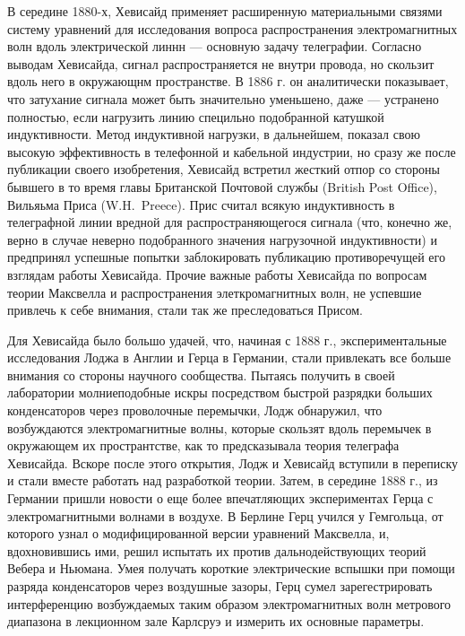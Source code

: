 \documentclass[12pt, oneside, a4paper]{article}
\begin{document}
В середине 1880-х, Хевисайд применяет расширенную материальными связями систему уравнений для исследования вопроса распространения электромагнитных волн вдоль электрической линнн --- основную задачу телеграфии. Согласно выводам Хевисайда, сигнал распространяется не внутри провода, но скользит вдоль него в окружающнм пространстве. В 1886 г. он аналитически показывает, что затухание сигнала может быть значительно уменьшено, даже --- устранено полностью, если нагрузить линию специльно подобранной катушкой индуктивности. Метод индуктивной нагрузки, в дальнейшем, показал свою высокую эффективность в телефонной и кабельной индустрии, но сразу же после публикации своего изобретения, Хевисайд встретил жесткий отпор со стороны бывшего в то время главы Британской Почтовой службы (British Post Office), Вильяьма Приса (W.H.~Preece). Прис считал всякую индуктивность в телеграфной линии вредной для распространяющегося сигнала (что, конечно же, верно в случае неверно подобранного значения нагрузочной индуктивности) и предпринял успешные попытки заблокировать публикацию противоречущей его взглядам работы Хевисайда. Прочие важные работы Хевисайда по вопросам теории Максвелла и распространения элеткромагнитных волн, не успевшие привлечь к себе внимания, стали так же преследоваться Присом.

Для Хевисайда было большо удачей, что, начиная с 1888 г., экспериментальные исследования Лоджа в Англии и Герца в Германии, стали привлекать все больше внимания со стороны научного сообщества. Пытаясь получить в своей лаборатории молниеподобные искры посредством быстрой разрядки больших конденсаторов через проволочные перемычки, Лодж обнаружил, что возбуждаются электромагнитные волны, которые скользят вдоль перемычек в окружающем их пространтстве, как то предсказывала теория телеграфа Хевисайда. Вскоре после этого открытия, Лодж и Хевисайд вступили в переписку и стали вместе работать над разработкой теории. Затем, в середине 1888 г., из Германии пришли новости о еще более впечатляющих экспериментах Герца с электромагнитными волнами в воздухе.  В Берлине Герц учился у Гемгольца, от которого узнал о модифицированной версии уравнений Максвелла, и, вдохновившись ими, решил испытать их против дальнодействующих теорий Вебера и Ньюмана. Умея получать короткие электрические вспышки при помощи разряда конденсаторов через воздушные зазоры, Герц сумел зарегестрировать интерференцию возбуждаемых таким образом электромагнитных волн метрового диапазона в  лекционном зале Карлсруэ и измерить их основные параметры.
\end{document}
